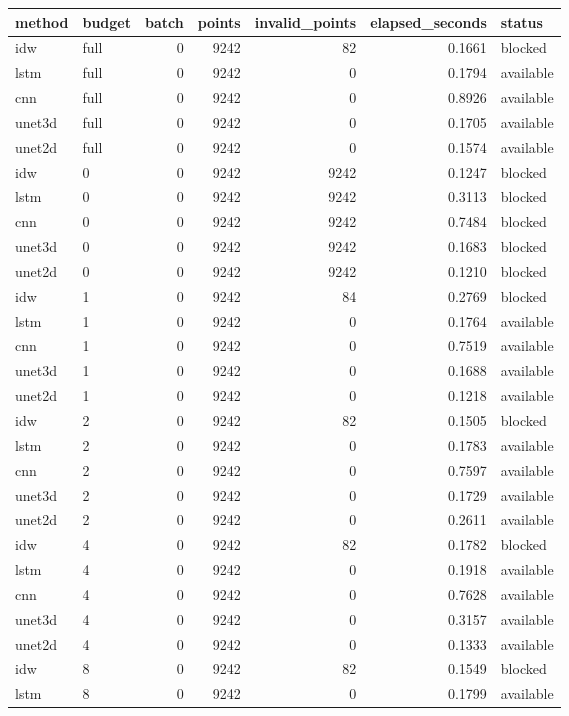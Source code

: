 \begin{tabular}{llrrrrl}
\toprule
method & budget & batch & points & invalid_points & elapsed_seconds & status \\
\midrule
idw & full & 0 & 9242 & 82 & 0.1661 & blocked \\
lstm & full & 0 & 9242 & 0 & 0.1794 & available \\
cnn & full & 0 & 9242 & 0 & 0.8926 & available \\
unet3d & full & 0 & 9242 & 0 & 0.1705 & available \\
unet2d & full & 0 & 9242 & 0 & 0.1574 & available \\
idw & 0 & 0 & 9242 & 9242 & 0.1247 & blocked \\
lstm & 0 & 0 & 9242 & 9242 & 0.3113 & blocked \\
cnn & 0 & 0 & 9242 & 9242 & 0.7484 & blocked \\
unet3d & 0 & 0 & 9242 & 9242 & 0.1683 & blocked \\
unet2d & 0 & 0 & 9242 & 9242 & 0.1210 & blocked \\
idw & 1 & 0 & 9242 & 84 & 0.2769 & blocked \\
lstm & 1 & 0 & 9242 & 0 & 0.1764 & available \\
cnn & 1 & 0 & 9242 & 0 & 0.7519 & available \\
unet3d & 1 & 0 & 9242 & 0 & 0.1688 & available \\
unet2d & 1 & 0 & 9242 & 0 & 0.1218 & available \\
idw & 2 & 0 & 9242 & 82 & 0.1505 & blocked \\
lstm & 2 & 0 & 9242 & 0 & 0.1783 & available \\
cnn & 2 & 0 & 9242 & 0 & 0.7597 & available \\
unet3d & 2 & 0 & 9242 & 0 & 0.1729 & available \\
unet2d & 2 & 0 & 9242 & 0 & 0.2611 & available \\
idw & 4 & 0 & 9242 & 82 & 0.1782 & blocked \\
lstm & 4 & 0 & 9242 & 0 & 0.1918 & available \\
cnn & 4 & 0 & 9242 & 0 & 0.7628 & available \\
unet3d & 4 & 0 & 9242 & 0 & 0.3157 & available \\
unet2d & 4 & 0 & 9242 & 0 & 0.1333 & available \\
idw & 8 & 0 & 9242 & 82 & 0.1549 & blocked \\
lstm & 8 & 0 & 9242 & 0 & 0.1799 & available \\

\end{tabular}
